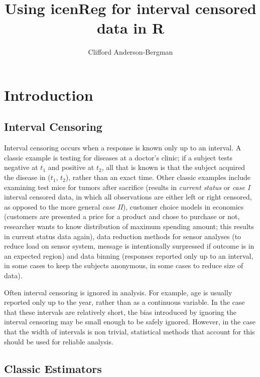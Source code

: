 \documentclass[11pt]{report}
\begin{document}


\title{Using {\bf{icenReg}} for interval censored data in {\bf{R} } }
\author{Clifford Anderson-Bergman}
\maketitle


\tableofcontents

\chapter{Introduction}

  \section{Interval Censoring}

  Interval censoring occurs when a response is known only up to an interval. 
  A classic example is testing for diseases at a doctor's clinic; if a 
  subject tests negative at $t_1$ and positive at $t_2$, all that is known is
  that the subject acquired the disease in ($t_1$, $t_2$), rather than an exact time. 
  Other classic examples include examining test mice for tumors after sacrifice 
  (results in \emph{current status} or \emph{case I} interval censored data, in which
  all observations are either left or right censored, as opposed to the more general
  \emph{case II}), customer choice models in economics (customers are presented a price
  for a product and chose to purchase or not, researcher wants to know distribution of 
  maximum spending amount; this results in current status data again), 
  data reduction methods for sensor analyses (to reduce load on sensor system, message
  is intentionally surpressed if outcome is in an expected region) and data binning 
  (responses reported only up to an interval, in some cases to keep the subjects
  anonymous, in some cases to reduce size of data). 

  
  Often interval censoring is ignored in analysis. For example, age is usually reported only 
  up to the year, rather than as a continuous variable. In the case that these intervals
  are relatively short, the bias introduced by ignoring the interval censoring may be 
  small enough to be safely ignored. However, in the case that the width of intervals is non
  trivial, statistical methods that account for this should be used for reliable analysis. 
  
  \section{Classic Estimators}
  
\end{document}

